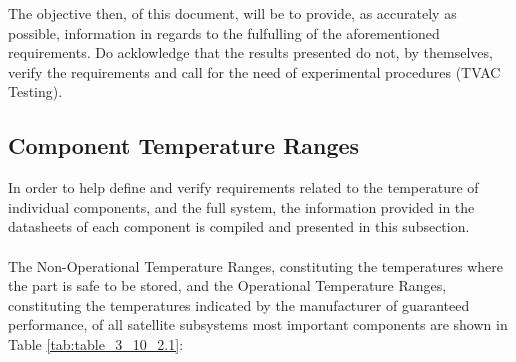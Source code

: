 The objective then, of this document, will be to provide, as accurately as possible,
information in regards to the fulfulling of the aforementioned requirements. Do acklowledge
that the results presented do not, by themselves, verify the requirements and call for
the need of experimental procedures (TVAC Testing).

\newpage

\subsection{Component Temperature Ranges}

In order to help define and verify requirements related to the temperature of individual
components, and the full system, the information provided in the datasheets of each component
is compiled and presented in this subsection.
\paragraph{}

The Non-Operational Temperature Ranges, constituting the temperatures where the part is safe to be stored,
and the Operational Temperature Ranges, constituting the temperatures indicated by the manufacturer of guaranteed
 performance, of all satellite subsystems most important components are shown in Table \ref{tab:table_3_10_2.1}:

